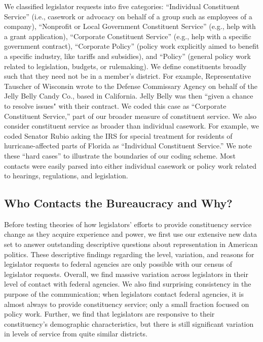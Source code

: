 \documentclass[12pt]{article}
\begin{document}
We classified legislator requests into five categories: ``Individual Constituent Service'' (i.e., casework or advocacy on behalf of a group such as employees of a company), ``Nonprofit or Local Government Constituent Service'' (e.g., help with a grant application), ``Corporate Constituent Service'' (e.g., help with a specific government contract), ``Corporate Policy'' (policy work explicitly aimed to benefit a specific industry, like tariffs and subsidies), and ``Policy'' (general policy work related to legislation, budgets, or rulemaking). We define constituents broadly such that they need not be in a member's district. For example, Representative Tauscher of Wisconsin wrote to the Defense Commissary Agency on behalf of the Jelly Belly Candy Co., based in California. Jelly Belly was then ``given a chance to resolve issues" with their contract. We coded this case as ``Corporate Constituent Service,'' part of our broader measure of constituent service. We also consider constituent service as broader than individual casework. For example, we coded Senator Rubio asking the IRS for special treatment for residents of hurricane-affected parts of Florida as ``Individual Constituent Service.'' We note these ``hard cases'' to illustrate the boundaries of our coding scheme. Most contacts were easily parsed into either individual casework or policy work related to hearings, regulations, and legislation.


\subsection{Who Contacts the Bureaucracy and Why?} \label{s:descriptive} 
Before testing theories of how legislators' efforts to provide constituency service change as they acquire experience and power, we first use our extensive new data set to answer outstanding descriptive questions about representation in American politics. These descriptive findings regarding the level, variation, and reasons for legislator requests to federal agencies are only possible with our census of legislator requests. Overall, we find massive variation across legislators in their level of contact with federal agencies. We also find surprising consistency in the purpose of the communication; when legislators contact federal agencies, it is almost always to provide constituency service; only a small fraction focused on policy work. Further, we find that legislators are responsive to their constituency's demographic characteristics, but there is still significant variation in levels of service from quite similar districts.  
\end{document}
